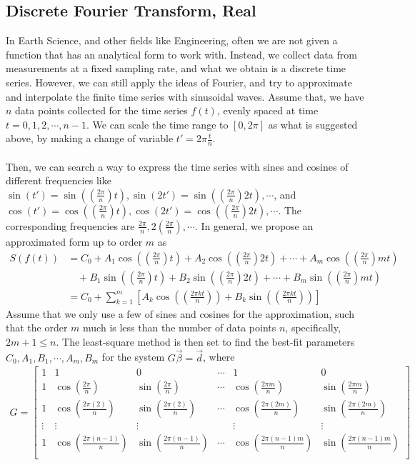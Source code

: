 \subsection{Discrete Fourier Transform, Real}
In Earth Science, and other fields like Engineering, often we are not given a function that has an analytical form to work with. Instead, we collect data from measurements at a fixed sampling rate, and what we obtain is a discrete time series. However, we can still apply the ideas of Fourier, and try to approximate and interpolate the finite time series with sinusoidal waves. Assume that, we have $n$ data points collected for the time series $f(t)$, evenly spaced at time $t = 0, 1, 2, \cdots, n-1$. We can scale the time range to $[0,2\pi]$ as what is suggested above, by making a change of variable $t' = 2\pi \frac{t}{n}$.\\
\\
Then, we can search a way to express the time series with sines and cosines of different frequencies like $\sin(t') = \sin((\frac{2\pi}{n})t), \sin(2t') = \sin((\frac{2\pi}{n})2t), \cdots$, and $\cos(t') = \cos((\frac{2\pi}{n})t), \cos(2t') = \cos((\frac{2\pi}{n})2t), \cdots$. The corresponding frequencies are $\frac{2\pi}{n}, 2(\frac{2\pi}{n}), \cdots$. In general, we propose an approximated form up to order $m$ as
\begin{align*}
S(f(t)) &= C_0 + A_1\cos((\frac{2\pi}{n})t) + A_2\cos((\frac{2\pi}{n})2t) + \cdots + A_m\cos((\frac{2\pi}{n})mt)\\
&\quad + B_1\sin((\frac{2\pi}{n})t) + B_2\sin((\frac{2\pi}{n})2t) + \cdots + B_m\sin((\frac{2\pi}{n})mt)\\
&= C_0 + \sum_{k=1}^{m} \left[A_k \cos((\frac{2\pi kt}{n})) + B_k \sin((\frac{2\pi kt}{n}))\right]
\end{align*}
Assume that we only use a few of sines and cosines for the approximation, such that the order $m$ much is less than the number of data points $n$, specifically, $2m+1 \leq n$. The least-square method is then set to find the best-fit parameters $C_0, A_1, B_1, \cdots, A_m, B_m$ for the system $G\vec{\beta} = \vec{d}$, where
\begin{align*}
G =
\begin{bmatrix}
1 & 1 & 0 & \cdots & 1 & 0 \\
1 & \cos(\frac{2\pi}{n}) & \sin(\frac{2\pi}{n}) & \cdots & \cos(\frac{2\pi m}{n}) & \sin(\frac{2\pi m}{n}) \\
1 & \cos(\frac{2\pi(2)}{n}) & \sin(\frac{2\pi(2)}{n}) & \cdots & \cos(\frac{2\pi (2m)}{n}) & \sin(\frac{2\pi (2m)}{n}) \\
\vdots & \vdots & \vdots & & \vdots & \vdots \\
1 & \cos(\frac{2\pi(n-1)}{n}) & \sin(\frac{2\pi(n-1)}{n}) & \cdots & \cos(\frac{2\pi (n-1)m}{n}) & \sin(\frac{2\pi (n-1)m}{n}) \\
\end{bmatrix}
\end{align*}
